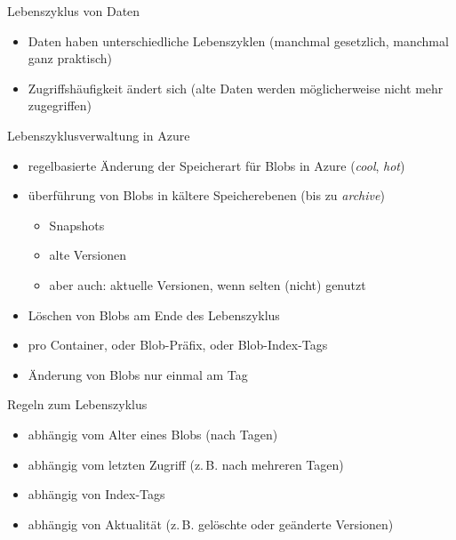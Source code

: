 
\begin{flashcard}[Definition]{Lebenszyklus von Daten}
  \begin{itemize}
    \item Daten haben unterschiedliche Lebenszyklen (manchmal gesetzlich, manchmal ganz praktisch)
    \item Zugriffshäufigkeit ändert sich (alte Daten werden möglicherweise nicht mehr zugegriffen)
  \end{itemize}
\end{flashcard}

\begin{flashcard}[Definition]{Lebenszyklusverwaltung in Azure}
  \begin{itemize}
    \item regelbasierte Änderung der Speicherart für Blobs in Azure (\emph{cool}, \emph{hot})
    \item überführung von Blobs in kältere Speicherebenen (bis zu \emph{archive})
      \begin{itemize}
        \item Snapshots
        \item alte Versionen
        \item aber auch: aktuelle Versionen, wenn selten (nicht) genutzt
      \end{itemize}
     \item Löschen von Blobs am Ende des Lebenszyklus
     \item pro Container, oder Blob-Präfix, oder Blob-Index-Tags
     \item Änderung von Blobs nur einmal am Tag
  \end{itemize}
\end{flashcard}

\begin{flashcard}[Definition]{Regeln zum Lebenszyklus}
  \begin{itemize}
    \item abhängig vom Alter eines Blobs (nach Tagen)
    \item abhängig vom letzten Zugriff (z.\,B. nach mehreren Tagen)
    \item abhängig von Index-Tags
    \item abhängig von Aktualität (z.\,B. gelöschte oder geänderte Versionen)
  \end{itemize}
\end{flashcard}
